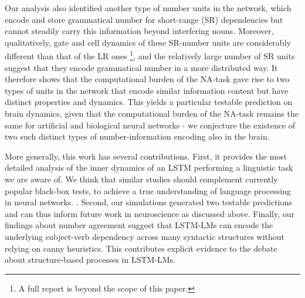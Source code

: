 Our analysis also identified another type of number units in the network, which encode and store grammatical number for short-range (SR) dependencies but cannot steadily carry this information beyond interfering nouns. Moreover, qualitatively, gate and cell dynamics of these SR-number units are considerably different than that of the LR ones \footnote{A full report is beyond the scope of this paper.}, and the relatively large number of SR units suggest that they encode grammatical number in a more distributed way. It therefore shows that the computational burden of the NA-task gave rise to two types of units in the network that encode similar information content but have distinct properties and dynamics. This yields a particular testable prediction on brain dynamics, given that the computational burden of the NA-task remains the same for artificial and biological neural networks - we conjecture the existence of two such distinct types of number-information encoding also in the brain.

More generally, this work has several contributions. First, it provides the most detailed analysis of the inner dynamics of an LSTM performing a linguistic task we are aware of. We think that similar studies should complement currently popular black-box tests, to achieve a true understanding of language processing in neural networks. . Second, our simulations generated two testable predictions and can thus inform future work in neuroscience as discussed above. Finally, our findings about number agreement suggest that LSTM-LMs can encode the underlying subject-verb dependency across many syntactic structures without relying on canny heuristics. This contributes explicit evidence to the debate about structure-based processes in LSTM-LMs.



